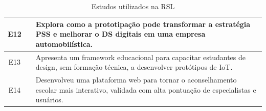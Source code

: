 \begin{table}[h!]
\begin{tabular}{|c|m{4cm}|m{10cm}|}
		E12 & \cite{yan2022pssvalue} & Explora como a prototipação pode transformar a estratégia PSS e melhorar o DS digitais em uma empresa automobilística. \\ \hline
		E13 & \cite{Kim2024} & Apresenta um framework educacional para capacitar estudantes de design, sem formação técnica, a desenvolver protótipos de IoT. \\ \hline
		E14 & \cite{Suryawati2024} & Desenvolveu uma plataforma web para tornar o aconselhamento escolar mais interativo, validada com alta pontuação de especialistas e usuários. \\ \hline
	\end{tabular}
	\caption{Estudos utilizados na RSL}
\end{table}










 
